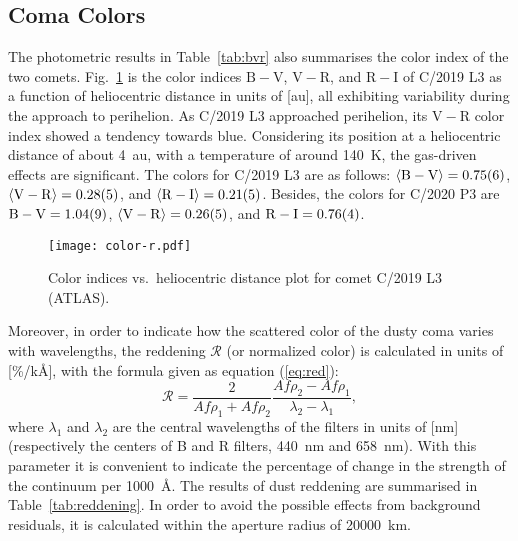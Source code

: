 \subsection{Coma Colors}

The photometric results in Table~\ref{tab:bvr} also summarises the color index of the two comets. 
Fig.~\ref{fig:color-r} is the color indices $\mathrm{B-V}$, $\mathrm{V-R}$, and $\mathrm{R-I}$ of C/2019 L3 as a function of heliocentric distance in units of [\unit{\astronomicalunit}], all exhibiting variability during the approach to perihelion. 
As C/2019 L3 approached perihelion, its $\mathrm{V-R}$ color index showed a tendency towards blue. 
Considering its position at a heliocentric distance of about {\qty{4}{\astronomicalunit}}, with a temperature of around {\qty{140}{\K}}, the gas-driven effects are significant. 
The colors for C/2019 L3 are as follows: 
$\langle \mathrm{B-V} \rangle = \num{0.75 +- 0.06}$, 
$\langle \mathrm{V-R} \rangle = \num{0.28 +- 0.05}$, and 
$\langle \mathrm{R-I} \rangle = \num{0.21 +- 0.05}$. 
Besides, the colors for C/2020 P3 are 
$\mathrm{B-V} = \num{1.04 +- 0.09}$, 
$\langle \mathrm{V-R} \rangle = \num{0.26 +- 0.05}$, and 
$\mathrm{R-I} = \num{0.76 +- 0.04}$.

\begin{figure}
    \centering
    \texttt{[image: color-r.pdf]} 
    \caption{Color indices vs.\ heliocentric distance plot for comet C/2019 L3 (ATLAS).}\label{fig:color-r}
\end{figure}

Moreover, in order to indicate how the scattered color of the dusty coma varies with wavelengths, the reddening $\mathcal{R}$ (or normalized color) \citep{jewitt_cometary_1986, lara_behaviour_2003, mazzotta_epifani_dust_2011, shi_ccd_2015} is calculated in units of [\unit{\percent/\kilo\angstrom}], with the formula given as equation (\ref{eq:red}): 
\begin{equation}
\mathcal{R} = \frac{2}{Af\rho_1 + Af\rho_2} \frac{Af\rho_2 - Af\rho_1}{\lambda_2 - \lambda_1}, 
\label{eq:red}
\end{equation}
where $\lambda_1$ and $\lambda_2$ are the central wavelengths of the filters in units of [\unit{\nm}] (respectively the centers of B and R filters, {\qty{440}{\nm}} and {\qty{658}{\nm}}). With this parameter it is convenient to indicate the percentage of change in the strength of the continuum per {\qty{1000}{\angstrom}}. The results of dust reddening are summarised in Table~\ref{tab:reddening}. In order to avoid the possible effects from background residuals, it is calculated within the aperture radius of {\qty{20000}{\km}}. 

